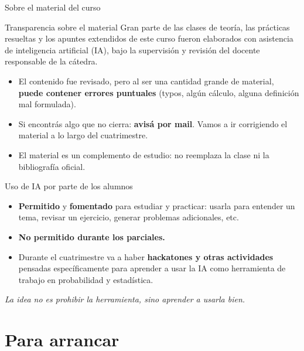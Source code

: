 \documentclass[aspectratio=169,11pt]{beamer}
\begin{document}
\begin{frame}{Sobre el material del curso}
\begin{alertblock}{Transparencia sobre el material}
Gran parte de las clases de teoría, las prácticas resueltas y los apuntes extendidos de este curso fueron elaborados con asistencia de inteligencia artificial (IA), bajo la supervisión y revisión del docente responsable de la cátedra.
\end{alertblock}
\begin{itemize}
\item El contenido fue revisado, pero al ser una cantidad grande de material, \textbf{puede contener errores puntuales} (typos, algún cálculo, alguna definición mal formulada).
\item Si encontrás algo que no cierra: \textbf{avisá por mail}. Vamos a ir corrigiendo el material a lo largo del cuatrimestre.
\item El material es un complemento de estudio: no reemplaza la clase ni la bibliografía oficial.
\end{itemize}
\end{frame}

\begin{frame}{Uso de IA por parte de los alumnos}
\begin{itemize}
\item \textbf{Permitido} y \textbf{fomentado} para estudiar y practicar: usarla para entender un tema, revisar un ejercicio, generar problemas adicionales, etc.
\item \textbf{No permitido durante los parciales.}
\item Durante el cuatrimestre va a haber \textbf{hackatones y otras actividades} pensadas específicamente para aprender a usar la IA como herramienta de trabajo en probabilidad y estadística.
\end{itemize}
\vspace{1em}
\centering
\emph{La idea no es prohibir la herramienta, sino aprender a usarla bien.}
\end{frame}

\section{Para arrancar}
\end{document}
